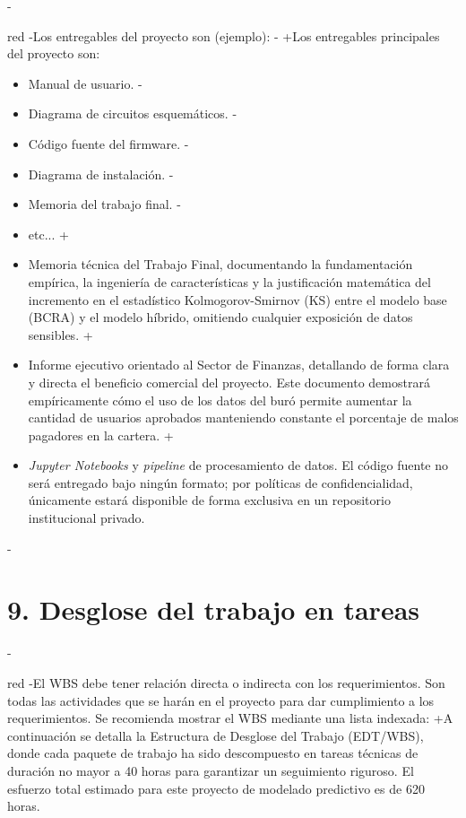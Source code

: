 \documentclass[
 11pt, %
-%
+codirector, %
 ]{charter}
\begin{document}
\begin{table}[ht]
\begin{table}[ht]
-\begin{consigna}{red}
-Los entregables del proyecto son (ejemplo):
-
+Los entregables principales del proyecto son:
 \begin{itemize}
-	\item Manual de usuario.
-	\item Diagrama de circuitos esquemáticos.
-	\item Código fuente del firmware.
-	\item Diagrama de instalación.
-	\item Memoria del trabajo final.
-	\item etc...
+    \item Memoria técnica del Trabajo Final, documentando la fundamentación empírica, la ingeniería de características y la justificación matemática del incremento en el estadístico Kolmogorov-Smirnov (KS) entre el modelo base (BCRA) y el modelo híbrido, omitiendo cualquier exposición de datos sensibles.
+    \item Informe ejecutivo orientado al Sector de Finanzas, detallando de forma clara y directa el beneficio comercial del proyecto. Este documento demostrará empíricamente cómo el uso de los datos del buró permite aumentar la cantidad de usuarios aprobados manteniendo constante el porcentaje de malos pagadores en la cartera.
+    \item \textit{Jupyter Notebooks} y \textit{pipeline} de procesamiento de datos. El código fuente no será entregado bajo ningún formato; por políticas de confidencialidad, únicamente estará disponible de forma exclusiva en un repositorio institucional privado.
 \end{itemize}
-\end{consigna}
 
 \section{9. Desglose del trabajo en tareas}
 \label{sec:wbs}
 
-\begin{consigna}{red}
-El WBS debe tener relación directa o indirecta con los requerimientos.  Son todas las actividades que se harán en el proyecto para dar cumplimiento a los requerimientos. Se recomienda mostrar el WBS mediante una lista indexada:
+A continuación se detalla la Estructura de Desglose del Trabajo (EDT/WBS), donde cada paquete de trabajo ha sido descompuesto en tareas técnicas de duración no mayor a 40 horas para garantizar un seguimiento riguroso. El esfuerzo total estimado para este proyecto de modelado predictivo es de 620 horas.
 

\end{consigna}
\end{table}
\end{table}
\end{document}

